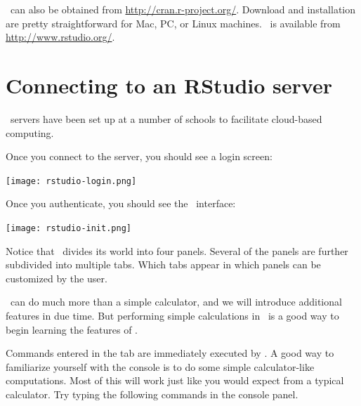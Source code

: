 \documentclass{tufte-book}\usepackage[]{graphicx}\usepackage[]{xcolor}
\begin{document}
\R\ can also be obtained from \url{http://cran.r-project.org/}.  
Download and installation are pretty straightforward for Mac, PC, or Linux machines.
\RStudio\ is available from \url{http://www.rstudio.org/}.



\section{Connecting to an RStudio server}

\RStudio\ servers have been set up at a number of schools to facilitate cloud-based computing.  

Once you connect to the server, you should see a login screen:

\texttt{[image: rstudio-login.png]}

Once you authenticate, 
you should see the \RStudio\ interface:

\texttt{[image: rstudio-init.png]}

Notice that \Rstudio\ divides its world into four panels.  Several of the panels
are further subdivided into multiple tabs.  Which tabs appear in which panels
can be customized by the user.

\R\ can do much more than a simple calculator, and we will introduce 
additional features in due time.  But performing simple calculations in \R\ is a
good way to begin learning the features of \RStudio.

Commands entered in the  tab are immediately executed by \R.
A good way to familiarize yourself with the console is to do some simple 
calculator-like computations.  Most of this will work just like you would 
expect from a typical calculator.
Try typing the following commands in the console panel.
\end{document}
